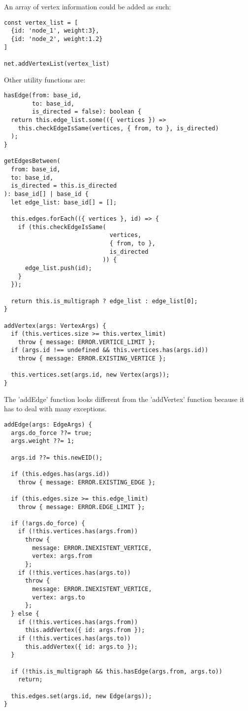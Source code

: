 An array of vertex information could be added as such:

\begin{verbatim}
const vertex_list = [
  {id: 'node_1', weight:3},
  {id: 'node_2', weight:1.2}
]

net.addVertexList(vertex_list)
\end{verbatim}

Other utility functions are:

\begin{verbatim}
hasEdge(from: base_id,
        to: base_id,
        is_directed = false): boolean {
  return this.edge_list.some(({ vertices }) =>
    this.checkEdgeIsSame(vertices, { from, to }, is_directed)
  );
}

getEdgesBetween(
  from: base_id,
  to: base_id,
  is_directed = this.is_directed
): base_id[] | base_id {
  let edge_list: base_id[] = [];

  this.edges.forEach(({ vertices }, id) => {
    if (this.checkEdgeIsSame(
                              vertices,
                              { from, to },
                              is_directed
                            )) {
      edge_list.push(id);
    }
  });

  return this.is_multigraph ? edge_list : edge_list[0];
}

addVertex(args: VertexArgs) {
  if (this.vertices.size >= this.vertex_limit)
    throw { message: ERROR.VERTICE_LIMIT };
  if (args.id !== undefined && this.vertices.has(args.id))
    throw { message: ERROR.EXISTING_VERTICE };

  this.vertices.set(args.id, new Vertex(args));
}
\end{verbatim}


The 'addEdge' function looks different from the 'addVertex' function because it has to deal with many exceptions.


\begin{verbatim}
addEdge(args: EdgeArgs) {
  args.do_force ??= true;
  args.weight ??= 1;

  args.id ??= this.newEID();

  if (this.edges.has(args.id))
    throw { message: ERROR.EXISTING_EDGE };

  if (this.edges.size >= this.edge_limit)
    throw { message: ERROR.EDGE_LIMIT };

  if (!args.do_force) {
    if (!this.vertices.has(args.from))
      throw {
        message: ERROR.INEXISTENT_VERTICE,
        vertex: args.from
      };
    if (!this.vertices.has(args.to))
      throw {
        message: ERROR.INEXISTENT_VERTICE,
        vertex: args.to
      };
  } else {
    if (!this.vertices.has(args.from))
      this.addVertex({ id: args.from });
    if (!this.vertices.has(args.to))
      this.addVertex({ id: args.to });
  }

  if (!this.is_multigraph && this.hasEdge(args.from, args.to))
    return;

  this.edges.set(args.id, new Edge(args));
}
\end{verbatim}


